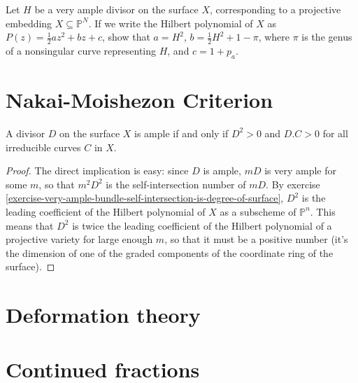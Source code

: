 \begin{exercise}
\label{exercise-very-ample-bundle-self-intersection-is-degree-of-surface}
\begin{reference}
\cite[V, Exercise 1.2]{har}
\end{reference}
Let $H$ be a very ample divisor on the surface $X$, corresponding to a
projective embedding $X\subseteq\mathbb{P}^N$. If we write the Hilbert
polynomial of $X$ as $P(z)=\frac{1}{2}az^2+bz+c$, show that $a=H^2$,
$b=\frac{1}{2}H^2+1-\pi$, where $\pi$ is the genus of a nonsingular curve
representing $H$, and $c=1+p_a$.
\end{exercise}

\section{Nakai-Moishezon Criterion}
\label{section-Nakai-Moishezon-criterion}

\begin{theorem}
\label{theorem-Nakai-Moishezon-criterion}
\begin{reference}
\cite[V, Theorem 1.10]{hart}
\end{reference}
A divisor $D$ on the surface $X$ is ample if and only if $D^2>0$ and $D.C>0$ for
all irreducible curves $C$ in $X$.
\end{theorem}

\begin{proof}
The direct implication is easy: since $D$ is ample,  $mD$ is very ample for some
$m$, so that $m^2D^2$ is the self-intersection number of $mD$. By exercise
\ref{exercise-very-ample-bundle-self-intersection-is-degree-of-surface},
 $D^2$ is the leading coefficient of the Hilbert polynomial of $X$ as a 
subscheme of $\mathbb{P}^n$. This means that $D^2$ is twice the leading
coefficient of the Hilbert polynomial of a projective variety for large enough
$m$, so that it must be a positive number (it's the dimension of one of the
graded components of the coordinate ring of the surface).
\end{proof}

\section{Deformation theory}
\label{section-deformation-theory}



\section{Continued fractions}
\label{section-continued-fractions}

